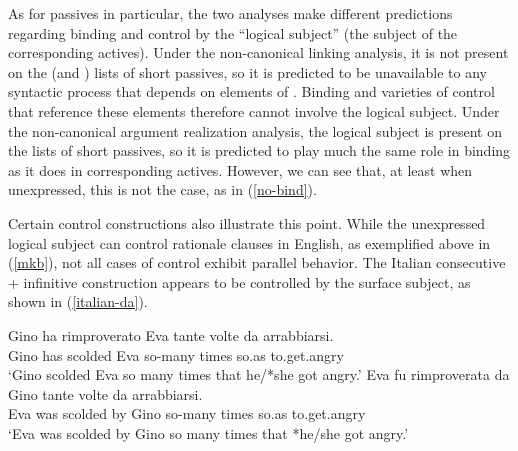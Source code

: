 \documentclass[output=paper
                ,modfonts
                ,nonflat
	        ,collection
	        ,collectionchapter
	        ,collectiontoclongg
 	        ,biblatex
                ,babelshorthands
                ,newtxmath
                ,draftmode
                ,colorlinks, citecolor=brown
]{./langsci/langscibook}
\begin{document}
As for passives in particular, the two analyses make different predictions regarding binding and control by the ``logical subject'' (the subject of the corresponding actives).
Under the non-canonical linking analysis, it is not present on the \argst (and \val) lists of short passives, so it is predicted to be unavailable to any syntactic process that depends on elements of \argst.
Binding and varieties of control that reference these elements therefore cannot involve the logical subject.
Under the non-canonical argument realization analysis, the logical subject is present on the \argst lists of short passives, so it is predicted to play much the same role in binding as it does in corresponding actives.
However, we can see that, at least when unexpressed, this is not the case, as in (\ref{no-bind}).
\begin{exe}
\end{exe}

Certain control constructions also illustrate this point.
While the unexpressed logical subject can control rationale clauses in English, as exemplified above in (\ref{mkb}), not all cases of control exhibit parallel behavior.
The Italian consecutive  + infinitive construction \citep{Perlmutter1984, Sanfilippo1998} appears to be controlled by the surface subject, as shown in (\ref{italian-da}).


\begin{exe}
\ex     \label{italian-da}
\begin{xlist}
\ex             \gll Gino ha rimproverato Eva tante volte da arrabbiarsi.  \\
                Gino has scolded Eva so-many times so.as to.get.angry  \\
                \glt `Gino scolded Eva so many times that he/*she got angry.'
\ex             \gll Eva fu rimproverata da Gino tante volte da arrabbiarsi.  \\
                Eva was scolded by Gino so-many times so.as to.get.angry  \\
                \glt `Eva was scolded by Gino so many times that *he/she got angry.'
\end{xlist}
\end{exe}
\end{document}
